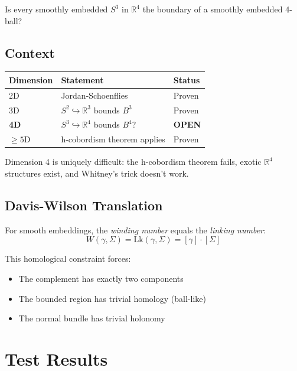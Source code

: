 \documentclass[12pt]{article}
\begin{document}
Is every smoothly embedded $S^3$ in $\mathbb{R}^4$ the boundary of a smoothly embedded 4-ball?

\subsection{Context}

\begin{center}
\begin{tabular}{lll}
\toprule
\textbf{Dimension} & \textbf{Statement} & \textbf{Status} \\
\midrule
2D & Jordan-Schoenflies & Proven \\
3D & $S^2 \hookrightarrow \mathbb{R}^3$ bounds $B^3$ & Proven \\
\textbf{4D} & $S^3 \hookrightarrow \mathbb{R}^4$ bounds $B^4$? & \textbf{OPEN} \\
$\geq 5$D & h-cobordism theorem applies & Proven \\
\bottomrule
\end{tabular}
\end{center}

Dimension 4 is uniquely difficult: the h-cobordism theorem fails, exotic $\mathbb{R}^4$ structures exist, and Whitney's trick doesn't work.

\subsection{Davis-Wilson Translation}

For smooth embeddings, the \emph{winding number} equals the \emph{linking number}:
\begin{equation}
W(\gamma, \Sigma) = \text{Lk}(\gamma, \Sigma) = [\gamma] \cdot [\Sigma]
\end{equation}

This homological constraint forces:
\begin{itemize}
\item The complement has exactly two components
\item The bounded region has trivial homology (ball-like)
\item The normal bundle has trivial holonomy
\end{itemize}

\section{Test Results}
\end{document}
